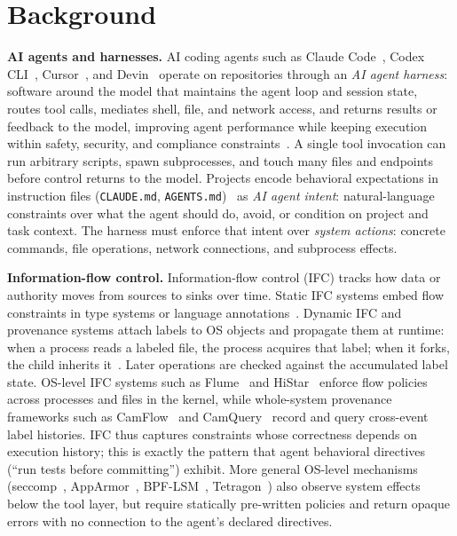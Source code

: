 \section{Background}
\label{sec:background}

\textbf{AI agents and harnesses.}
AI coding agents such as Claude
Code~\cite{anthropic2025claudecode}, Codex
CLI~\cite{openai2025codex}, Cursor~\cite{cursor2025}, and
Devin~\cite{devin2025} operate on repositories through an \emph{AI agent
harness}: software around the model that maintains the agent loop and
session state, routes tool calls, mediates shell, file, and network
access, and returns results or feedback to the model, improving agent
performance while keeping execution within safety, security, and
compliance constraints~\cite{langchain-harness,fowler-harness}. A single tool
invocation can run arbitrary scripts, spawn subprocesses, and touch many
files and endpoints before control returns to the model. Projects encode
behavioral expectations in instruction files
(\texttt{CLAUDE.md},
\texttt{AGENTS.md})~\cite{chatlatanagulchai2025manifests,lulla2026agentsmd}
as \emph{AI agent intent}: natural-language constraints over what the agent
should do, avoid, or condition on project and task context. The harness
must enforce that intent over \emph{system actions}: concrete commands,
file operations, network connections, and subprocess effects.

\textbf{Information-flow control.}
Information-flow control (IFC) tracks how data or authority moves from
sources to sinks over time. Static IFC systems embed flow constraints in
type systems or language annotations~\cite{myers1999jflow}. Dynamic IFC
and provenance systems attach labels to OS objects and propagate them at
runtime: when a process reads a labeled file, the process acquires that
label; when it forks, the child inherits
it~\cite{enck2010taintdroid,clause2007dytan,pasquier2017camflow}. Later
operations are checked against the accumulated label state. OS-level IFC
systems such as Flume~\cite{flume} and HiStar~\cite{zeldovich2006histar}
enforce flow policies across processes and files in the kernel, while
whole-system provenance frameworks such as
CamFlow~\cite{pasquier2017camflow} and
CamQuery~\cite{pasquier2018camquery} record and query cross-event label
histories. IFC thus captures constraints whose correctness depends on
execution history; this is exactly the pattern that agent behavioral directives (``run
tests before committing'') exhibit. More general OS-level mechanisms
(seccomp~\cite{seccomp-bpf}, AppArmor~\cite{apparmor},
BPF-LSM~\cite{linuxbpflsm}, Tetragon~\cite{ciliumtetragon}) also observe
system effects below the tool layer, but require statically pre-written
policies and return opaque errors with no connection to the agent's
declared directives.

